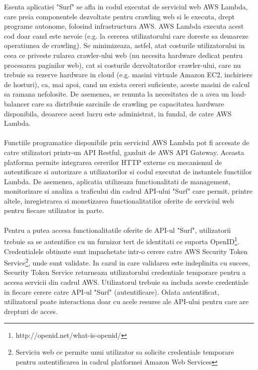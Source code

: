 \newcommand{\AWSSTS}{Serviciu web ce permite unui utilizator sa solicite credentiale temporare pentru autentificarea in cadrul platformei Amazon Web Services}
\newcommand{\openIDDefinition}{http://openid.net/what-is-openid/}


Esenta aplicatiei "Surf" se afla in codul executat de serviciul web AWS Lambda, care preia componentele dezvoltate pentru crawling web si le executa, drept programe autonome, folosind infrastructura AWS. AWS Lambda executa acest cod doar cand este nevoie (e.g. la cererea utilizatorului care doreste sa demareze operatiunea de crawling). Se minimizeaza, astfel, atat costurile utilizatorului in ceea ce priveste rularea crawler-ului web (nu necesita hardware dedicat pentru procesarea paginilor web), cat si costurile dezvoltatorilor crawler-ului, care nu trebuie sa rezerve hardware in cloud (e.g. masini virtuale Amazon EC2, inchiriere de hosturi), ca, mai apoi, cand nu exista cereri suficiente, aceste masini de calcul sa ramana nefolosite. De asemenea, se renunta la necesitatea de a avea un load-balancer care sa distribuie sarcinile de crawling pe capacitatea hardware disponibila, deoarece acest lucru este administrat, in fundal, de catre AWS Lambda.
\\
\\
Functiile programatice disponibile prin serviciul AWS Lambda pot fi accesate de catre utilizatori printr-un API Restful, gazduit de AWS API Gateway. Aceasta platforma permite integrarea cererilor HTTP externe cu mecanismul de autentificare si autorizare a utilizatorilor si codul executat de instantele functiilor Lambda. De asemenea, aplicatia utilizeaza functionalitati de management, monitorizare si analiza a traficului din cadrul API-ului "Surf" care permit, printre altele, inregistrarea si monetizarea functionalitatilor oferite de serviciul web pentru fiecare utilizator in parte. 
\\
\\
Pentru a putea accesa functionalitatile oferite de API-ul "Surf", utilizatorii trebuie sa se autentifice cu un furnizor tert de identitati ce suporta OpenID\footnote{\openIDDefinition}. Credentialele obtinute sunt impachetate intr-o cerere catre AWS Security Token Service\footnote{\AWSSTS}, unde sunt validate. In cazul in care validarea este indeplinita cu succes, Security Token Service returneaza utilizatorului credentiale temporare pentru a accesa servicii din cadrul AWS. Utilizatorul trebuie sa includa aceste credentiale in fiecare cerere catre API-ul "Surf" (autentificare). Odata autentificat, utilizatorul poate interactiona doar cu acele resurse ale API-ului pentru care are drepturi de acces. 
\newpage

